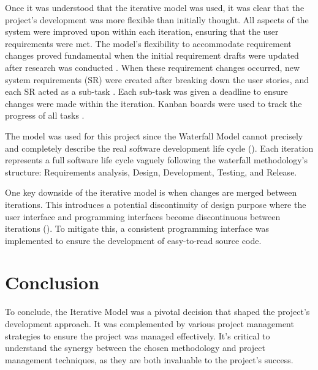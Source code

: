 Once it was understood that the iterative model was used, it was clear that the project's development was more flexible than initially thought. All aspects of the system were improved upon within each iteration, ensuring that the user requirements were met. The model's flexibility to accommodate requirement changes proved fundamental when the initial requirement drafts were updated after research was conducted . When these requirement changes occurred, new system requirements (SR) were created after breaking down the user stories, and each SR acted as a sub-task . Each sub-task was given a deadline to ensure changes were made within the iteration. Kanban boards were used to track the progress of all tasks .

The model was used for this project since the Waterfall Model cannot precisely and completely describe the real software development life cycle (\cite{dapeng_liu_case_2011}). Each iteration represents a full software life cycle vaguely following the waterfall methodology's structure: Requirements analysis, Design, Development, Testing, and Release.

One key downside of the iterative model is when changes are merged between iterations. This introduces a potential discontinuity of design purpose where the user interface and programming interfaces become discontinuous between iterations (\cite{dapeng_liu_case_2011}). To mitigate this, a consistent programming interface was implemented to ensure the development of easy-to-read source code.

\section{Conclusion}

To conclude, the Iterative Model was a pivotal decision that shaped the project's development approach. It was complemented by various project management strategies  to ensure the project was managed effectively. It's critical to understand the synergy between the chosen methodology and project management techniques, as they are both invaluable to the project's success.
